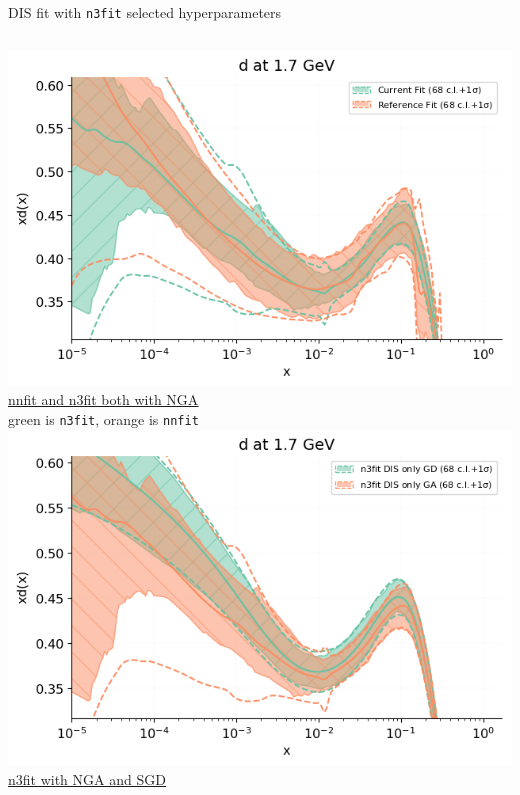 \begin{frame}{DIS fit with \texttt{n3fit} selected hyperparameters}
\vspace{15pt}
\begin{columns}[onlytextwidth]
\includegraphics[width=\textwidth]{DIS_NNFITvsN3FIT_GAonly.png} \\
\hspace{0mm} \href{http://vp.nnpdf.science/yWw6yZRERZaCu3kbd96psg==/}{\color{blue} \underline{nnfit and n3fit both with NGA}} \\ 
{\hspace*{5mm}\tiny green is \texttt{n3fit}, orange is \texttt{nnfit}}
\includegraphics[width=\textwidth]{DIS_N3FIT_GAvsSGD.png} \\
\hspace{5mm} \href{http://vp.nnpdf.science/kxAUcKA5QX-4nD_gECTfiQ==/}{\color{blue} \underline{n3fit with NGA and SGD}}

\end{columns}

\end{frame}

